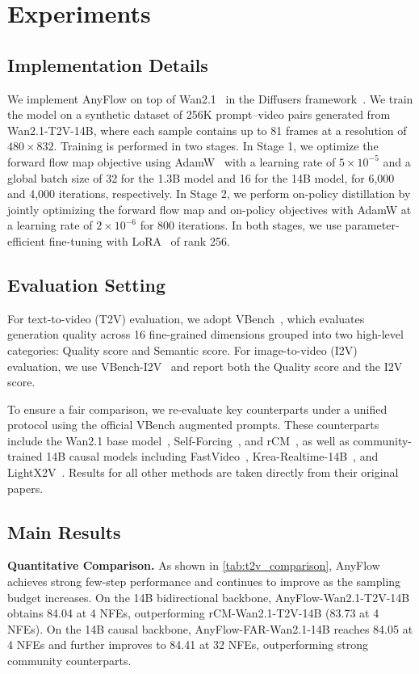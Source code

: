 \documentclass{llmxive}
\providecommand{\myPara}[1]{\noindent\textbf{#1}}
\begin{document}
\section{Experiments}

\subsection{Implementation Details}
We implement AnyFlow on top of Wan2.1~\cite{wan2025wan} in the Diffusers framework~\cite{von-platen-etal-2022-diffusers}. We train the model on a synthetic dataset of 256K prompt--video pairs generated from Wan2.1-T2V-14B, where each sample contains up to 81 frames at a resolution of $480 \times 832$. Training is performed in two stages. In Stage 1, we optimize the forward flow map objective using AdamW~\cite{loshchilov2017decoupled} with a learning rate of $5 \times 10^{-5}$ and a global batch size of 32 for the 1.3B model and 16 for the 14B model, for 6,000 and 4,000 iterations, respectively. In Stage 2, we perform on-policy distillation by jointly optimizing the forward flow map and on-policy objectives with AdamW at a learning rate of $2 \times 10^{-6}$ for 800 iterations. In both stages, we use parameter-efficient fine-tuning with LoRA~\cite{hu2022lora} of rank 256.

\subsection{Evaluation Setting}
For text-to-video (T2V) evaluation, we adopt VBench~\cite{huang2023vbench}, which evaluates generation quality across 16 fine-grained dimensions grouped into two high-level categories: Quality score and Semantic score. For image-to-video (I2V) evaluation, we use VBench-I2V~\cite{huang2025vbench++} and report both the Quality score and the I2V score.

To ensure a fair comparison, we re-evaluate key counterparts under a unified protocol using the official VBench augmented prompts. These counterparts include the Wan2.1 base model~\cite{wan2025wan}, Self-Forcing~\cite{huang2025selfforcing}, and rCM~\cite{zheng2025large}, as well as community-trained 14B causal models including FastVideo~\cite{causalwan2025}, Krea-Realtime-14B~\cite{krea_realtime_14b}, and LightX2V~\cite{lightx2v}. Results for all other methods are taken directly from their original papers.
\subsection{Main Results}
\myPara{Quantitative Comparison.}
As shown in \cref{tab:t2v_comparison}, AnyFlow achieves strong few-step performance and continues to improve as the sampling budget increases. On the 14B bidirectional backbone, AnyFlow-Wan2.1-T2V-14B obtains 84.04 at 4 NFEs, outperforming rCM-Wan2.1-T2V-14B (83.73 at 4 NFEs). On the 14B causal backbone, AnyFlow-FAR-Wan2.1-14B reaches 84.05 at 4 NFEs and further improves to 84.41 at 32 NFEs, outperforming strong community counterparts.
\end{document}
